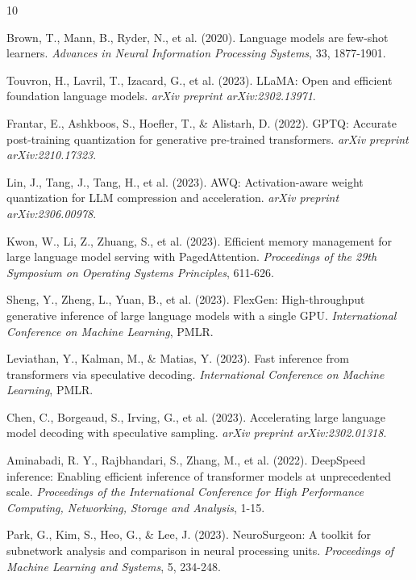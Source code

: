 \documentclass[twocolumn,10pt]{article}
\begin{document}

\begin{thebibliography}{10}

Brown, T., Mann, B., Ryder, N., et al. (2020). Language models are few-shot learners. \emph{Advances in Neural Information Processing Systems}, 33, 1877-1901.

Touvron, H., Lavril, T., Izacard, G., et al. (2023). LLaMA: Open and efficient foundation language models. \emph{arXiv preprint arXiv:2302.13971}.

Frantar, E., Ashkboos, S., Hoefler, T., \& Alistarh, D. (2022). GPTQ: Accurate post-training quantization for generative pre-trained transformers. \emph{arXiv preprint arXiv:2210.17323}.

Lin, J., Tang, J., Tang, H., et al. (2023). AWQ: Activation-aware weight quantization for LLM compression and acceleration. \emph{arXiv preprint arXiv:2306.00978}.

Kwon, W., Li, Z., Zhuang, S., et al. (2023). Efficient memory management for large language model serving with PagedAttention. \emph{Proceedings of the 29th Symposium on Operating Systems Principles}, 611-626.

Sheng, Y., Zheng, L., Yuan, B., et al. (2023). FlexGen: High-throughput generative inference of large language models with a single GPU. \emph{International Conference on Machine Learning}, PMLR.

Leviathan, Y., Kalman, M., \& Matias, Y. (2023). Fast inference from transformers via speculative decoding. \emph{International Conference on Machine Learning}, PMLR.

Chen, C., Borgeaud, S., Irving, G., et al. (2023). Accelerating large language model decoding with speculative sampling. \emph{arXiv preprint arXiv:2302.01318}.

Aminabadi, R. Y., Rajbhandari, S., Zhang, M., et al. (2022). DeepSpeed inference: Enabling efficient inference of transformer models at unprecedented scale. \emph{Proceedings of the International Conference for High Performance Computing, Networking, Storage and Analysis}, 1-15.

Park, G., Kim, S., Heo, G., \& Lee, J. (2023). NeuroSurgeon: A toolkit for subnetwork analysis and comparison in neural processing units. \emph{Proceedings of Machine Learning and Systems}, 5, 234-248.

\end{thebibliography}
\end{document}
